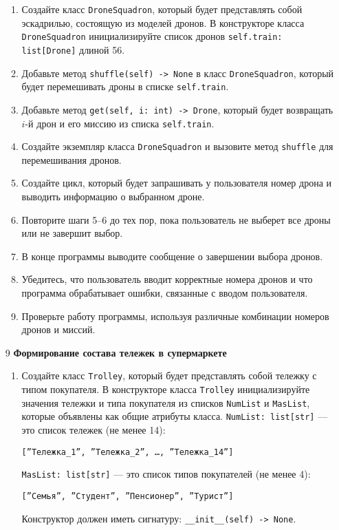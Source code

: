 \begin{enumerate}
\begin{enumerate}
    \item Создайте класс \texttt{DroneSquadron}, который будет представлять собой эскадрилью, состоящую из моделей дронов. В конструкторе класса \texttt{DroneSquadron} инициализируйте список дронов \texttt{self.train: list[Drone]} длиной 56.

    \item Добавьте метод \texttt{shuffle(self) -> None} в класс \texttt{DroneSquadron}, который будет перемешивать дроны в списке \texttt{self.train}.

    \item Добавьте метод \texttt{get(self, i: int) -> Drone}, который будет возвращать $i$-й дрон и его миссию из списка \texttt{self.train}.

    \item Создайте экземпляр класса \texttt{DroneSquadron} и вызовите метод \texttt{shuffle} для перемешивания дронов.

    \item Создайте цикл, который будет запрашивать у пользователя номер дрона и выводить информацию о выбранном дроне.

    \item Повторите шаги 5–6 до тех пор, пока пользователь не выберет все дроны или не завершит выбор.

    \item В конце программы выводите сообщение о завершении выбора дронов.

    \item Убедитесь, что пользователь вводит корректные номера дронов и что программа обрабатывает ошибки, связанные с вводом пользователя.

    \item Проверьте работу программы, используя различные комбинации номеров дронов и миссий.
\end{enumerate}

\item[9] \textbf{Формирование состава тележек в супермаркете}
\begin{enumerate}
    \item Создайте класс \texttt{Trolley}, который будет представлять собой тележку с типом покупателя. В конструкторе класса \texttt{Trolley} инициализируйте значения тележки и типа покупателя из списков \texttt{NumList} и \texttt{MasList}, которые объявлены как общие атрибуты класса. \texttt{NumList: list[str]} — это список тележек (не менее 14): 
    \begin{center}
        \texttt{[''Тележка\_1'', ''Тележка\_2'', \dots, ''Тележка\_14'']}
    \end{center}
    \texttt{MasList: list[str]} — это список типов покупателей (не менее 4):
    \begin{center}
        \texttt{[''Семья'', ''Студент'', ''Пенсионер'', ''Турист'']}
    \end{center}
    Конструктор должен иметь сигнатуру: \texttt{\_\_init\_\_(self) -> None}.


\end{enumerate}
\end{enumerate}
